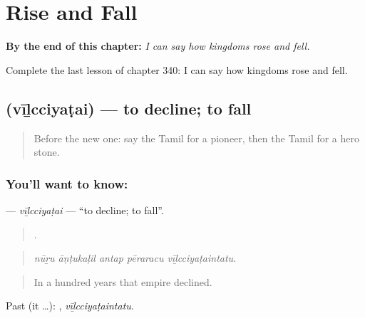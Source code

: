 
\chapter{Rise and Fall}
\label{ch:ta-rise-and-fall}

\begin{chapteropening}
\textbf{By the end of this chapter:} \emph{I can say how kingdoms rose and fell.}

Complete the last lesson of chapter 340: I can say how kingdoms rose and fell.
\end{chapteropening}

\section[\texorpdfstring{\ta{வீழ்ச்சியடை} (vīḻcciyaṭai)}{வீழ்ச்சியடை (vīḻcciyaṭai)}]{ (vīḻcciyaṭai) — to decline; to fall}

\label{lesson:TA-C340-vilcciyatai}



\begin{quote}
Before the new one: say the Tamil for a pioneer, then the Tamil for a hero stone.
\end{quote}

\subsection*{You'll want to know: }
\textbf{} — \emph{vīḻcciyaṭai} — \textquotedblleft{}to decline; to fall\textquotedblright{}.

\begin{quote}
    .
\end{quote}

\begin{quote}
\emph{nūṟu āṇṭukaḷil antap pēraracu vīḻcciyaṭaintatu.}
\end{quote}

\begin{quote}
In a hundred years that empire declined.
\end{quote}

Past (it …): , \emph{vīḻcciyaṭaintatu}.

